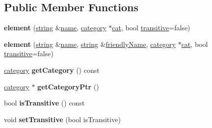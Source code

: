 \subsection*{\-Public \-Member \-Functions}
\begin{DoxyCompactItemize}
\item 
\hypertarget{classmbdev__ontology_1_1element_a1314f373fcfc0e4f8621e7272c7f96f1}{{\bfseries element} (\hyperlink{classmbdev_1_1string}{string} \&\hyperlink{classmbdev__ontology_1_1node_a0f69893fcec007d0766997400830a204}{name}, \hyperlink{classmbdev__ontology_1_1category}{category} $\ast$\hyperlink{classmbdev__ontology_1_1element_a90da561e20a92103b33e879e78032e0a}{cat}, bool \hyperlink{classmbdev__ontology_1_1element_a2dd58a46bab19cdf0c243bcd84c23fdb}{transitive}=false)}\label{classmbdev__ontology_1_1element_a1314f373fcfc0e4f8621e7272c7f96f1}

\item 
\hypertarget{classmbdev__ontology_1_1element_ad50e1b6aa536a204bd6a47ca0cbc5754}{{\bfseries element} (\hyperlink{classmbdev_1_1string}{string} \&\hyperlink{classmbdev__ontology_1_1node_a0f69893fcec007d0766997400830a204}{name}, \hyperlink{classmbdev_1_1string}{string} \&\hyperlink{classmbdev__ontology_1_1node_a8af5c00f684a8c06ceeddd0a2b1ff97c}{friendly\-Name}, \hyperlink{classmbdev__ontology_1_1category}{category} $\ast$\hyperlink{classmbdev__ontology_1_1element_a90da561e20a92103b33e879e78032e0a}{cat}, bool \hyperlink{classmbdev__ontology_1_1element_a2dd58a46bab19cdf0c243bcd84c23fdb}{transitive}=false)}\label{classmbdev__ontology_1_1element_ad50e1b6aa536a204bd6a47ca0cbc5754}

\item 
\hypertarget{classmbdev__ontology_1_1element_ad61d2fbc29f304a342a24080f2950769}{\hyperlink{classmbdev__ontology_1_1category}{category} {\bfseries get\-Category} () const }\label{classmbdev__ontology_1_1element_ad61d2fbc29f304a342a24080f2950769}

\item 
\hypertarget{classmbdev__ontology_1_1element_a3edbfba48add185625a883daab537a4a}{\hyperlink{classmbdev__ontology_1_1category}{category} $\ast$ {\bfseries get\-Category\-Ptr} ()}\label{classmbdev__ontology_1_1element_a3edbfba48add185625a883daab537a4a}

\item 
\hypertarget{classmbdev__ontology_1_1element_a661134a04667b21be53139bf5a73deef}{bool {\bfseries is\-Transitive} () const }\label{classmbdev__ontology_1_1element_a661134a04667b21be53139bf5a73deef}

\item 
\hypertarget{classmbdev__ontology_1_1element_ae4ae80555e858025b5bb8eeff2d44bac}{void {\bfseries set\-Transitive} (bool is\-Transitive)}\label{classmbdev__ontology_1_1element_ae4ae80555e858025b5bb8eeff2d44bac}

\end{DoxyCompactItemize}
